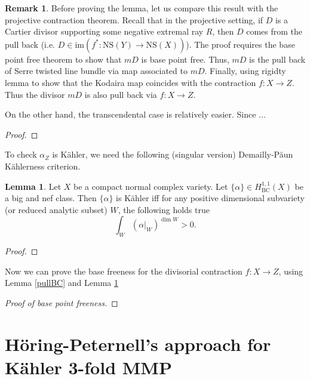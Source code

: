 \documentclass[11pt]{article}
\theoremstyle{definition}
\newtheorem{lemma}[theorem]{Lemma}
\newtheorem{remark}[theorem]{Remark}
\begin{document}
	
	\begin{remark}
		Before proving the lemma, let us compare this result with the projective contraction theorem. Recall that in the projective setting, if $D$ is a Cartier divisor supporting some negative extremal ray $R$, then $D$ comes from the pull back (i.e. $D\in \text{im}(f^* : \text{NS}(Y) \to \text{NS}(X))$). The proof requires the base point free theorem to show that $mD$ is base point free. Thus, $mD$ is the pull back of Serre twisted line bundle via map associated to $mD$. Finally, using rigidty lemma to show that the Kodaira map coincides with the contraction $f:X\to Z$. Thus the divisor $mD$ is also pull back via $f:X\to Z$.
		
		On the other hand, the transcendental case is relatively easier. Since ... 
	\end{remark}
	\begin{proof}
		
	\end{proof}
	To check $\alpha_Z$ is K\"ahler, we need the following (singular version) Demailly-P\u{a}un K\"ahlerness criterion. 
	\begin{lemma}\label{DPcriterion}
		Let $X$ be a compact normal complex variety. Let $\{\alpha\}\in H^{1,1}_{\text{BC}}(X)$ be a big and nef class. Then $\{\alpha\}$ is K\"ahler iff for any positive dimensional subvariety (or reduced analytic subset) $W$, the following holds true $$\int_W  (\alpha|_W)^{\dim W}>0.$$
	\end{lemma}
	
	\begin{proof}
		
	\end{proof}
	Now we can prove the base freeness for the divisorial contraction $f:X\to Z$, using Lemma \ref{pullBC} and Lemma \ref{DPcriterion}
	\begin{proof}[Proof of base point freeness]
		
	\end{proof}
	
	\section{H\"oring-Peternell's approach for K\"ahler 3-fold MMP}
	
	
	
\end{document}
